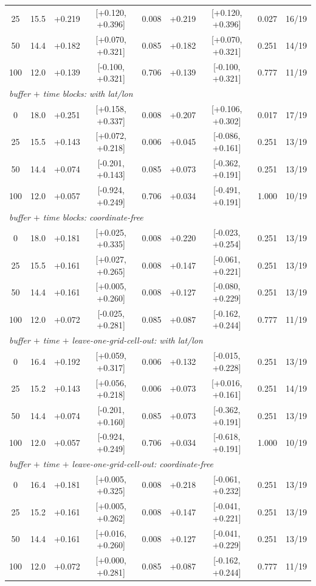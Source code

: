 \documentclass[11pt]{article}
\begin{document}
\begin{table}[htbp]
\begin{tabular}{ccccccccc}
25 & 15.5 & +0.219 & [+0.120, +0.396] & 0.008 & +0.219 & [+0.120, +0.396] & 0.027 & 16/19 \\
50 & 14.4 & +0.182 & [+0.070, +0.321] & 0.085 & +0.182 & [+0.070, +0.321] & 0.251 & 14/19 \\
100 & 12.0 & +0.139 & [-0.100, +0.321] & 0.706 & +0.139 & [-0.100, +0.321] & 0.777 & 11/19 \\
\multicolumn{9}{l}{\textit{buffer $+$ time blocks: with lat/lon}} \\
0 & 18.0 & +0.251 & [+0.158, +0.337] & 0.008 & +0.207 & [+0.106, +0.302] & 0.017 & 17/19 \\
25 & 15.5 & +0.143 & [+0.072, +0.218] & 0.006 & +0.045 & [-0.086, +0.161] & 0.251 & 13/19 \\
50 & 14.4 & +0.074 & [-0.201, +0.143] & 0.085 & +0.073 & [-0.362, +0.191] & 0.251 & 13/19 \\
100 & 12.0 & +0.057 & [-0.924, +0.249] & 0.706 & +0.034 & [-0.491, +0.191] & 1.000 & 10/19 \\
\multicolumn{9}{l}{\textit{buffer $+$ time blocks: coordinate-free}} \\
0 & 18.0 & +0.181 & [+0.025, +0.335] & 0.008 & +0.220 & [-0.023, +0.254] & 0.251 & 13/19 \\
25 & 15.5 & +0.161 & [+0.027, +0.265] & 0.008 & +0.147 & [-0.061, +0.221] & 0.251 & 13/19 \\
50 & 14.4 & +0.161 & [+0.005, +0.260] & 0.008 & +0.127 & [-0.080, +0.229] & 0.251 & 13/19 \\
100 & 12.0 & +0.072 & [-0.025, +0.281] & 0.085 & +0.087 & [-0.162, +0.244] & 0.777 & 11/19 \\
\multicolumn{9}{l}{\textit{buffer $+$ time $+$ leave-one-grid-cell-out: with lat/lon}} \\
0 & 16.4 & +0.192 & [+0.059, +0.317] & 0.006 & +0.132 & [-0.015, +0.228] & 0.251 & 13/19 \\
25 & 15.2 & +0.143 & [+0.056, +0.218] & 0.006 & +0.073 & [+0.016, +0.161] & 0.251 & 14/19 \\
50 & 14.4 & +0.074 & [-0.201, +0.160] & 0.085 & +0.073 & [-0.362, +0.191] & 0.251 & 13/19 \\
100 & 12.0 & +0.057 & [-0.924, +0.249] & 0.706 & +0.034 & [-0.618, +0.191] & 1.000 & 10/19 \\
\multicolumn{9}{l}{\textit{buffer $+$ time $+$ leave-one-grid-cell-out: coordinate-free}} \\
0 & 16.4 & +0.181 & [+0.005, +0.325] & 0.008 & +0.218 & [-0.061, +0.232] & 0.251 & 13/19 \\
25 & 15.2 & +0.161 & [+0.005, +0.262] & 0.008 & +0.147 & [-0.041, +0.221] & 0.251 & 13/19 \\
50 & 14.4 & +0.161 & [+0.016, +0.260] & 0.008 & +0.127 & [-0.041, +0.229] & 0.251 & 13/19 \\
100 & 12.0 & +0.072 & [+0.000, +0.281] & 0.085 & +0.087 & [-0.162, +0.244] & 0.777 & 11/19 \\
\bottomrule\end{tabular}\end{table}
\end{document}
